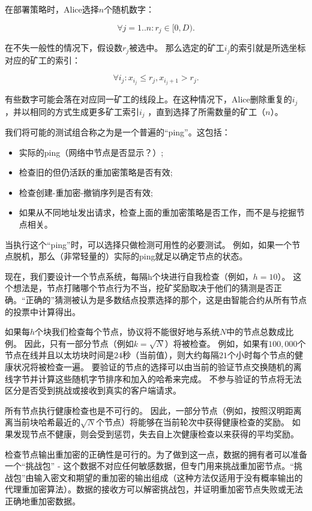 \documentclass[longbibliography,nofootinbib]{revtex4-1}
\begin{document}
        在部署策略时，Alice选择$n$个随机数字：
    
\begin{equation}
    \forall j=1..n: r_j \in [0, D).
\end{equation}

        在不失一般性的情况下，假设数$r_j$被选中。 那么选定的矿工$i_j$的索引就是所选坐标对应的矿工的索引：

\begin{equation}
    \forall i_j: x_{i_j} \le r_j, x_{i_j + 1} > r_j.
\end{equation}

        有些数字可能会落在对应同一矿工的线段上。在这种情况下，Alice删除重复的$i_j$ ，并以相同的方式生成更多矿工索引$i_j$ ，直到选择了所需数量的矿工（$n$）。

        我们将可能的测试组合称之为是一个普遍的“ping”。这包括：
\begin{itemize}
    \item 实际的ping（网络中节点是否显示？）;
    \item 检查旧的但仍活跃的重加密策略是否有效;
    \item 检查创建-重加密-撤销序列是否有效;
    \item 如果从不同地址发出请求，检查上面的重加密策略是否工作，而不是与挖掘节点相关。
\end{itemize}
        当执行这个“ping”时，可以选择只做检测可用性的必要测试。 例如，如果一个节点脱机，那么（非常轻量的）实际的ping就足以确定节点的状态。
    
    
    现在，我们要设计一个节点系统，每隔h个块进行自我检查（例如，$h=10$）。 这个想法是，节点打赌哪个节点行为不当，挖矿奖励取决于他们的猜测是否正确。“正确的”猜测被认为是多数结点投票选择的那个，这是由智能合约从所有节点的投票中计算得出。
    
    如果每$h$个块我们检查每个节点，协议将不能很好地与系统$N$中的节点总数成比例。 因此，只有一部分节点（例如$k=\sqrt{N}$）将被检查。 例如，如果有$100,000$个节点在线并且以太坊块时间是$24$秒（当前值），则大约每隔$21$个小时每个节点的健康状况将被检查一遍。 要验证的节点的选择可以由当前的验证节点交换随机的离线字节并计算这些随机字节排序和加入的哈希来完成。 不参与验证的节点将无法区分是否受到挑战或接收到真实的客户端请求。

    所有节点执行健康检查也是不可行的。 因此，一部分节点（例如，按照汉明距离离当前块哈希最近的$\sqrt{N}$个节点）将能够在当前轮次中获得健康检查的奖励。 如果发现节点不健康，则会受到惩罚，失去自上次健康检查以来获得的平均奖励。

    检查节点输出重加密的正确性是可行的。为了做到这一点，数据的拥有者可以准备一个“挑战包” - 这个数据不对应任何敏感数据，但专门用来挑战重加密节点。“挑战包”由输入密文和期望的重加密的输出组成（这种方法仅适用于没有概率输出的代理重加密算法）。数据的接收方可以解密挑战包，并证明重加密节点失败或无法正确地重加密数据。
\end{document}
